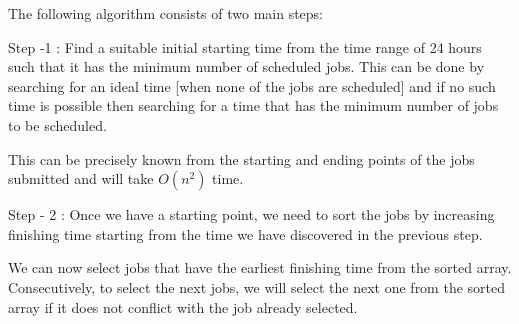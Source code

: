 \documentclass[letterpaper,portrait,12pt]{article}
\begin{document}
\begin{flushleft}

\end{flushleft}


\begin{flushleft}
The following algorithm consists of two main steps:
\end{flushleft}


\begin{flushleft}

\end{flushleft}


\begin{flushleft}
Step -1 : Find a suitable initial starting time from the time range of 24 hours such that it has the minimum number of scheduled jobs. This can be done by searching for an ideal time [when none of the jobs are scheduled] and if no such time is possible then searching for a time that has the minimum number of jobs to be scheduled.
\end{flushleft}


\begin{flushleft}

\end{flushleft}


\begin{flushleft}
This can be precisely known from the starting and ending points of the jobs submitted and will take $O(n^2)$ time.
\end{flushleft}


\begin{flushleft}

\end{flushleft}


\begin{flushleft}
Step - 2 : Once we have a starting point, we need to sort the jobs by increasing finishing time starting from the time we have discovered in the previous step.
\end{flushleft}


\begin{flushleft}

\end{flushleft}


\begin{flushleft}
We can now select jobs that have the earliest finishing time from the sorted array. Consecutively, to select the next jobs, we will select the next one from the sorted array if it does not conflict with the job already selected.
\end{flushleft}
\end{document}
